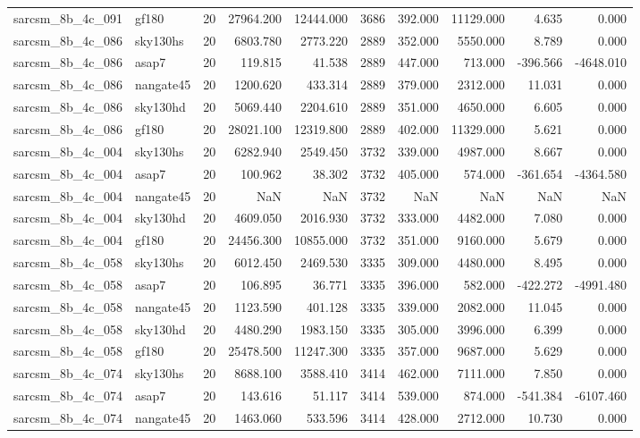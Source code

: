 \begin{longtable}{llrrrrrrrr}
sarcsm\_8b\_4c\_091 & gf180 & 20 & 27964.200 & 12444.000 & 3686 & 392.000 & 11129.000 & 4.635 & 0.000 \\
sarcsm\_8b\_4c\_086 & sky130hs & 20 & 6803.780 & 2773.220 & 2889 & 352.000 & 5550.000 & 8.789 & 0.000 \\
sarcsm\_8b\_4c\_086 & asap7 & 20 & 119.815 & 41.538 & 2889 & 447.000 & 713.000 & -396.566 & -4648.010 \\
sarcsm\_8b\_4c\_086 & nangate45 & 20 & 1200.620 & 433.314 & 2889 & 379.000 & 2312.000 & 11.031 & 0.000 \\
sarcsm\_8b\_4c\_086 & sky130hd & 20 & 5069.440 & 2204.610 & 2889 & 351.000 & 4650.000 & 6.605 & 0.000 \\
sarcsm\_8b\_4c\_086 & gf180 & 20 & 28021.100 & 12319.800 & 2889 & 402.000 & 11329.000 & 5.621 & 0.000 \\
sarcsm\_8b\_4c\_004 & sky130hs & 20 & 6282.940 & 2549.450 & 3732 & 339.000 & 4987.000 & 8.667 & 0.000 \\
sarcsm\_8b\_4c\_004 & asap7 & 20 & 100.962 & 38.302 & 3732 & 405.000 & 574.000 & -361.654 & -4364.580 \\
sarcsm\_8b\_4c\_004 & nangate45 & 20 & NaN & NaN & 3732 & NaN & NaN & NaN & NaN \\
sarcsm\_8b\_4c\_004 & sky130hd & 20 & 4609.050 & 2016.930 & 3732 & 333.000 & 4482.000 & 7.080 & 0.000 \\
sarcsm\_8b\_4c\_004 & gf180 & 20 & 24456.300 & 10855.000 & 3732 & 351.000 & 9160.000 & 5.679 & 0.000 \\
sarcsm\_8b\_4c\_058 & sky130hs & 20 & 6012.450 & 2469.530 & 3335 & 309.000 & 4480.000 & 8.495 & 0.000 \\
sarcsm\_8b\_4c\_058 & asap7 & 20 & 106.895 & 36.771 & 3335 & 396.000 & 582.000 & -422.272 & -4991.480 \\
sarcsm\_8b\_4c\_058 & nangate45 & 20 & 1123.590 & 401.128 & 3335 & 339.000 & 2082.000 & 11.045 & 0.000 \\
sarcsm\_8b\_4c\_058 & sky130hd & 20 & 4480.290 & 1983.150 & 3335 & 305.000 & 3996.000 & 6.399 & 0.000 \\
sarcsm\_8b\_4c\_058 & gf180 & 20 & 25478.500 & 11247.300 & 3335 & 357.000 & 9687.000 & 5.629 & 0.000 \\
sarcsm\_8b\_4c\_074 & sky130hs & 20 & 8688.100 & 3588.410 & 3414 & 462.000 & 7111.000 & 7.850 & 0.000 \\
sarcsm\_8b\_4c\_074 & asap7 & 20 & 143.616 & 51.117 & 3414 & 539.000 & 874.000 & -541.384 & -6107.460 \\
sarcsm\_8b\_4c\_074 & nangate45 & 20 & 1463.060 & 533.596 & 3414 & 428.000 & 2712.000 & 10.730 & 0.000 \\

\end{longtable}
